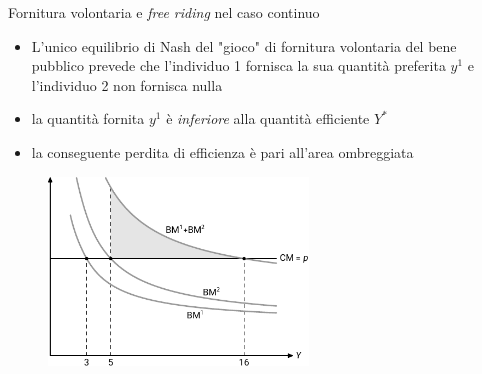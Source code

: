 \documentclass[aspectratio=149,11pt]{beamer}
\begin{document}
\begin{frame}{Fornitura volontaria e \emph{free riding} nel caso continuo}
\begin{itemize}
\item L'unico equilibrio di Nash del "gioco" di fornitura volontaria del bene
pubblico prevede che l'individuo 1 fornisca la sua quantità preferita
$y^{1}$ e l'individuo 2 non fornisca nulla
\item la quantità fornita $y^{1}$ è \emph{inferiore} alla quantità efficiente $Y^{*}$
\item la conseguente perdita di efficienza è pari all'area ombreggiata
\end{itemize}

\begin{figure}[htbp]
\centering
\includegraphics[height=5cm]{./figure/bene-pubblico-equilibrio.pdf}
\end{figure} 
\end{frame}
\end{document}
